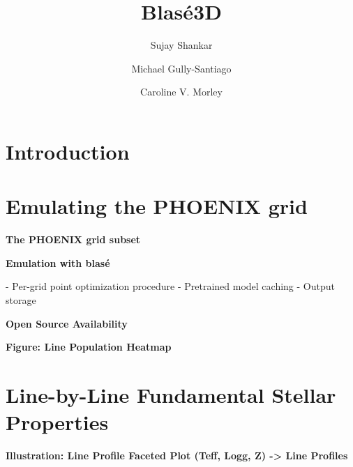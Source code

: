 \documentclass[twocolumn]{aastex631}
\begin{document}
\title{Blas\'e3D}

\author[0000-0002-2290-6810]{Sujay Shankar}
\author[0000-0002-4020-3457]{Michael Gully-Santiago}
\author[0000-0002-4404-0456]{Caroline V. Morley}

\begin{abstract}
    \blindtext
\end{abstract}

\keywords{}


\section{Introduction}
\blindtext


\section{Emulating the PHOENIX grid}

\begin{mdframed}
    \textbf{The PHOENIX grid subset}
    
    \textcolor{lightgray}{\blindtext}
\end{mdframed}

\begin{mdframed}
    \textbf{Emulation with blas\'e}

    - Per-grid point optimization procedure
    - Pretrained model caching
    - Output storage
    
    \textcolor{lightgray}{\blindtext}
\end{mdframed}

\begin{mdframed}
    \textbf{Open Source Availability}
    
    \textcolor{lightgray}{\blindtext}
\end{mdframed}

\begin{mdframed}
    \textbf{Figure: Line Population Heatmap}
\end{mdframed}


\section{Line-by-Line Fundamental Stellar Properties}
\begin{mdframed}
    \textbf{Illustration: Line Profile Faceted Plot (Teff, Logg, Z) -> Line Profiles}
\end{mdframed}
\end{document}
